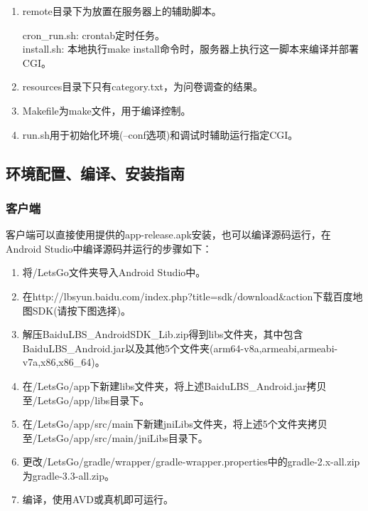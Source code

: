 \documentclass[UTF8]{article}
\begin{document}
\begin{enumerate}
    \item remote目录下为放置在服务器上的辅助脚本。\\
    \begin{tcolorbox}[colback=white]
        cron\_run.sh: crontab定时任务。\\
        install.sh: 本地执行make install命令时，服务器上执行这一脚本来编译并部署CGI。
    \end{tcolorbox}

    \item resources目录下只有category.txt，为问卷调查的结果。
    \item Makefile为make文件，用于编译控制。
    \item run.sh用于初始化环境(--conf选项)和调试时辅助运行指定CGI。
\end{enumerate}

\subsection{环境配置、编译、安装指南}
\subsubsection{客户端}
客户端可以直接使用提供的app-release.apk安装，也可以编译源码运行，在Android Studio中编译源码并运行的步骤如下：
\begin{enumerate}
    \item 将/LetsGo文件夹导入Android Studio中。
    \item 在http://lbsyun.baidu.com/index.php?title=sdk/download\&action下载百度地图SDK(请按下图选择)。
    \item 解压BaiduLBS\_AndroidSDK\_Lib.zip得到libs文件夹，其中包含BaiduLBS\_Android.jar以及其他5个文件夹(arm64-v8a,armeabi,armeabi-v7a,x86,x86\_64)。
    \item 在/LetsGo/app下新建libs文件夹，将上述BaiduLBS\_Android.jar拷贝至/LetsGo/app/libs目录下。
    \item 在/LetsGo/app/src/main下新建jniLibs文件夹，将上述5个文件夹拷贝至/LetsGo/app/src/main/jniLibs目录下。
    \item 更改/LetsGo/gradle/wrapper/gradle-wrapper.properties中的gradle-2.x-all.zip为gradle-3.3-all.zip。
    \item 编译，使用AVD或真机即可运行。
\end{enumerate}
\end{document}
